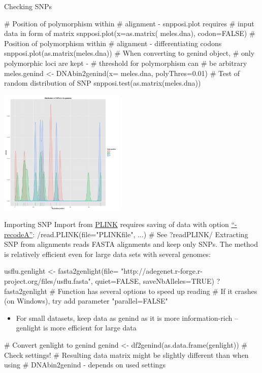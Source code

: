 \documentclass[compress, ucs, xelatex, 11pt, xcolor=svgnames,
  hyperref={
    bookmarks=true,
    unicode=true,
    colorlinks=true,
    pdftitle={Molecular data in R},
    plainpages=false,
    pdfauthor={Vojtech Zeisek},
    pdfsubject={Course about phylogeny and evolution in R},
    pdfcreator={XeLaTeX},
    pdfkeywords={R, evolution, phylogeny, molecular data},
    linkcolor=Tomato,
    anchorcolor=SaddleBrown,
    citecolor=Goldenrod,
    filecolor=DarkMagenta,
    menucolor=Sienna,
    urlcolor=DarkTurquoise,
    pdftex},
  url={hyphens, lowtilde} %
  ]{beamer}
\begin{document}
\begin{frame}[fragile]{Checking SNPs}
\begin{multicols}{2}
  \begin{spluscode}
    # Position of polymorphism within
    # alignment - snpposi.plot requires
    # input data in form of matrix
    snpposi.plot(x=as.matrix(
      meles.dna), codon=FALSE)
    # Position of polymorphism within
    # alignment - differentiating codons
    snpposi.plot(as.matrix(meles.dna))
    # When converting to genind object,
    # only polymorphic loci are kept - 
    # threshold for polymorphism can
    # be arbitrary
    meles.genind <- DNAbin2genind(x=
      meles.dna, polyThres=0.01)
    # Test of random distribution of SNP
    snpposi.test(as.matrix(meles.dna))
  \end{spluscode}
  \begin{flushright}
    \includegraphics[height=6cm]{snpposi.png}
  \end{flushright}
\end{multicols}
\end{frame}

\begin{frame}[fragile]{Importing SNP}
Import from \href{http://pngu.mgh.harvard.edu/~purcell/plink/}{PLINK} requires saving of data with option \href{http://pngu.mgh.harvard.edu/~purcell/plink/dataman.shtml#recode}{``-recodeA''}:
\splus/read.PLINK(file="PLINKfile", ...) # See ?readPLINK/
Extracting SNP from alignments reads FASTA alignments and keep only SNPs. The method is relatively efficient even for large data sets with several genomes:
  \begin{spluscode}
    usflu.genlight <- fasta2genlight(file=
      "http://adegenet.r-forge.r-project.org/files/usflu.fasta",
      quiet=FALSE, saveNbAlleles=TRUE)
    ?fasta2genlight # Function has several options to speed up reading
    # If it crashes (on Windows), try add parameter "parallel=FALSE"
  \end{spluscode}
\begin{itemize}
 \item For small datasets, keep data as genind as it is more information-rich -- genlight is more efficient for large data
\end{itemize}
  \begin{spluscode}
    # Convert genlight to genind
    genind <- df2genind(as.data.frame(genlight)) # Check settings!
    # Resulting data matrix might be slightly different than when using
    # DNAbin2genind - depends on used settings
  \end{spluscode}
\end{frame}
\end{document}
